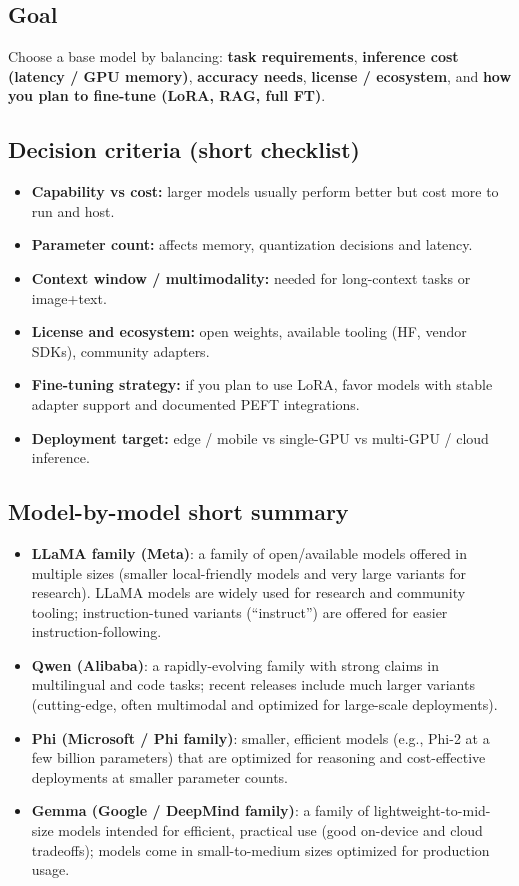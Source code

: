 \subsection{Goal}
Choose a base model by balancing: \textbf{task requirements}, \textbf{inference cost (latency / GPU memory)}, \textbf{accuracy needs}, \textbf{license / ecosystem}, and \textbf{how you plan to fine-tune (LoRA, RAG, full FT)}.

\subsection{Decision criteria (short checklist)}
\begin{itemize}
  \item \textbf{Capability vs cost:} larger models usually perform better but cost more to run and host.
  \item \textbf{Parameter count:} affects memory, quantization decisions and latency.
  \item \textbf{Context window / multimodality:} needed for long-context tasks or image+text.
  \item \textbf{License and ecosystem:} open weights, available tooling (HF, vendor SDKs), community adapters.
  \item \textbf{Fine-tuning strategy:} if you plan to use LoRA, favor models with stable adapter support and documented PEFT integrations.
  \item \textbf{Deployment target:} edge / mobile vs single-GPU vs multi-GPU / cloud inference.
\end{itemize}

\subsection{Model-by-model short summary}
\begin{itemize}
  \item \textbf{LLaMA family (Meta)}: a family of open/available models offered in multiple sizes (smaller local-friendly models and very large variants for research). LLaMA models are widely used for research and community tooling; instruction-tuned variants (``instruct'') are offered for easier instruction-following. 
  \item \textbf{Qwen (Alibaba)}: a rapidly-evolving family with strong claims in multilingual and code tasks; recent releases include much larger variants (cutting-edge, often multimodal and optimized for large-scale deployments).
  \item \textbf{Phi (Microsoft / Phi family)}: smaller, efficient models (e.g., Phi-2 at a few billion parameters) that are optimized for reasoning and cost-effective deployments at smaller parameter counts.
  \item \textbf{Gemma (Google / DeepMind family)}: a family of lightweight-to-mid-size models intended for efficient, practical use (good on-device and cloud tradeoffs); models come in small-to-medium sizes optimized for production usage.
\end{itemize}

